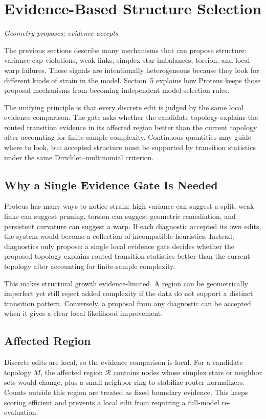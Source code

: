 \documentclass[11pt]{article}
\newcommand{\sectionsubtitle}[1]{\vspace{-0.25em}\noindent\textit{#1}\par\vspace{0.75em}}
\theoremstyle{definition}
\theoremstyle{plain}
\begin{document}
\section{Evidence-Based Structure Selection}
\label{sec:evidence}
\sectionsubtitle{Geometry proposes; evidence accepts}

The previous sections describe many mechanisms that can propose structure: variance-cap violations, weak links, simplex-star imbalances, torsion, and local warp failures. These signals are intentionally heterogeneous because they look for different kinds of strain in the model. Section~5 explains how Proteus keeps those proposal mechanisms from becoming independent model-selection rules.

The unifying principle is that every discrete edit is judged by the same local evidence comparison. The gate asks whether the candidate topology explains the routed transition evidence in its affected region better than the current topology after accounting for finite-sample complexity. Continuous quantities may guide where to look, but accepted structure must be supported by transition statistics under the same Dirichlet--multinomial criterion.

\subsection{Why a Single Evidence Gate Is Needed}
Proteus has many ways to notice strain: high variance can suggest a split, weak links can suggest pruning, torsion can suggest geometric remediation, and persistent curvature can suggest a warp. If each diagnostic accepted its own edits, the system would become a collection of incompatible heuristics. Instead, diagnostics only propose; a single local evidence gate decides whether the proposed topology explains routed transition statistics better than the current topology after accounting for finite-sample complexity.

This makes structural growth evidence-limited. A region can be geometrically imperfect yet still reject added complexity if the data do not support a distinct transition pattern. Conversely, a proposal from any diagnostic can be accepted when it gives a clear local likelihood improvement.

\subsection{Affected Region}
Discrete edits are local, so the evidence comparison is local. For a candidate topology $M$, the affected region $\mathcal R$ contains nodes whose simplex stars or neighbor sets would change, plus a small neighbor ring to stabilize router normalizers. Counts outside this region are treated as fixed boundary evidence. This keeps scoring efficient and prevents a local edit from requiring a full-model re-evaluation.
\end{document}
